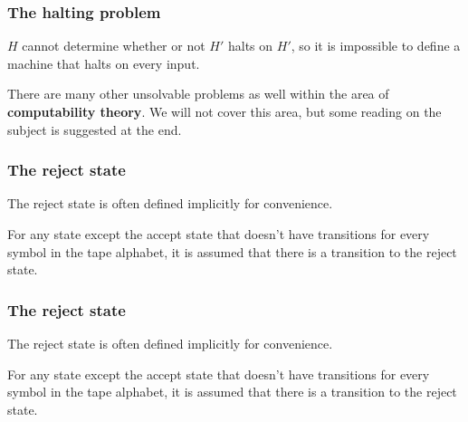 \documentclass[aspectratio=169]{beamer}
\begin{document}
\begin{frame}
\frametitle{The halting problem}

$H$ cannot determine whether or not $H'$ halts on $H'$, so it is impossible to define a machine that halts on every input.

There are many other unsolvable problems as well within the area of {\bf computability theory}. We will not cover this area, but some reading on the subject is suggested at the end.

\end{frame}

\begin{frame}
\frametitle{The reject state}

The reject state is often defined implicitly for convenience.

For any state except the accept state that doesn't have transitions for every symbol in the tape alphabet, it is assumed that there is a transition to the reject state.

\begin{center}
\end{center}
\end{frame}

\begin{frame}[noframenumbering]
\frametitle{The reject state}

The reject state is often defined implicitly for convenience.

For any state except the accept state that doesn't have transitions for every symbol in the tape alphabet, it is assumed that there is a transition to the reject state.

\begin{center}
\end{center}
\end{frame}
\end{document}
